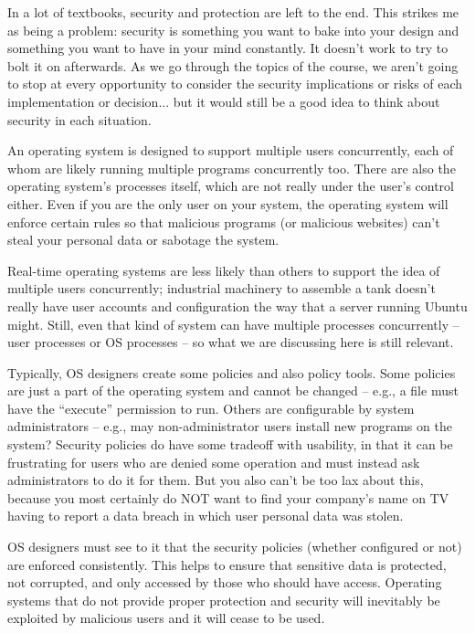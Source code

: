 In a lot of textbooks, security and protection are left to the end. This strikes me as being a problem: security is something you want to bake into your design and something you want to have in your mind constantly. It doesn't work to try to bolt it on afterwards. As we go through the topics of the course, we aren't going to stop at every opportunity to consider the security implications or risks of each implementation or decision... but it would still be a good idea to think about security in each situation.

An operating system is designed to support multiple users concurrently, each of whom are likely running multiple programs concurrently too. There are also the operating system's processes itself, which are not really under the user's control either. Even if you are the only user on your system, the operating system will enforce certain rules so that malicious programs (or malicious websites) can't steal your personal data or sabotage the system. 

Real-time operating systems are less likely than others to support the idea of multiple users concurrently; industrial machinery to assemble a tank doesn't really have user accounts and configuration the way that a server running Ubuntu might. Still, even that kind of system can have multiple processes concurrently -- user processes or OS processes -- so what we are discussing here is still relevant. 

Typically, OS designers create some policies and also policy tools. Some policies are just a part of the operating system and cannot be changed -- e.g., a file must have the ``execute'' permission to run. Others are configurable by system administrators -- e.g., may non-administrator users install new programs on the system? Security policies do have some tradeoff with usability, in that it can be frustrating for users who are denied some operation and must instead ask administrators to do it for them. But you also can't be too lax about this, because you most certainly do NOT want to find your company's name on TV having to report a data breach in which user personal data was stolen.

OS designers must see to it that the security policies (whether configured or not) are enforced consistently. This helps to ensure that sensitive data is protected, not corrupted, and only accessed by those who should have access. Operating systems that do not provide proper protection and security will inevitably be exploited by malicious users and it will cease to be used. 

